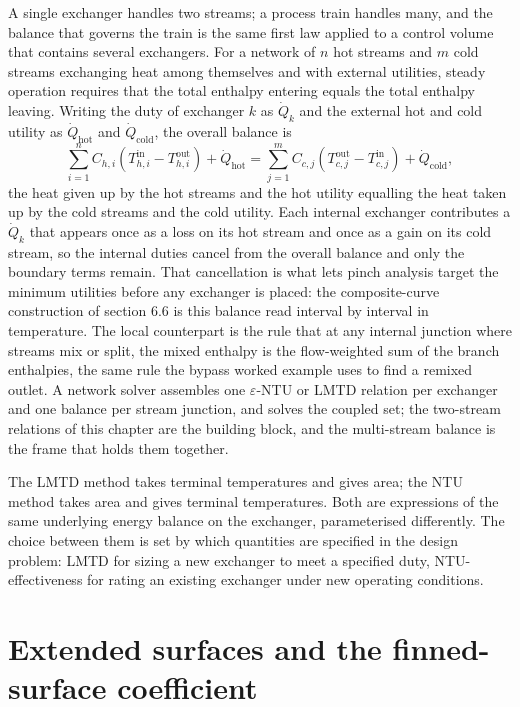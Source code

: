 A single exchanger handles two streams; a process train handles many, and the
balance that governs the train is the same first law applied to a control volume
that contains several exchangers. For a network of $n$ hot streams and $m$ cold
streams exchanging heat among themselves and with external utilities, steady
operation requires that the total enthalpy entering equals the total enthalpy
leaving. Writing the duty of exchanger $k$ as $\dot{Q}_k$ and the external hot and
cold utility as $\dot{Q}_{\text{hot}}$ and $\dot{Q}_{\text{cold}}$, the overall
balance is
\[
\sum_{i=1}^{n} C_{h,i}(T_{h,i}^{\text{in}} - T_{h,i}^{\text{out}})
+ \dot{Q}_{\text{hot}}
= \sum_{j=1}^{m} C_{c,j}(T_{c,j}^{\text{out}} - T_{c,j}^{\text{in}})
+ \dot{Q}_{\text{cold}},
\]
the heat given up by the hot streams and the hot utility equalling the heat taken
up by the cold streams and the cold utility. Each internal exchanger contributes a
$\dot{Q}_k$ that appears once as a loss on its hot stream and once as a gain on its
cold stream, so the internal duties cancel from the overall balance and only the
boundary terms remain. That cancellation is what lets pinch analysis target the
minimum utilities before any exchanger is placed: the composite-curve construction
of section 6.6 is this balance read interval by interval in temperature. The local
counterpart is the rule that at any internal junction where streams mix or split,
the mixed enthalpy is the flow-weighted sum of the branch enthalpies, the same rule
the bypass worked example uses to find a remixed outlet. A network solver assembles
one $\varepsilon$-NTU or LMTD relation per exchanger and one balance per stream
junction, and solves the coupled set; the two-stream relations of this chapter are
the building block, and the multi-stream balance is the frame that holds them
together.

\begin{principle}
The LMTD method takes terminal temperatures and gives area; the NTU
method takes area and gives terminal temperatures. Both are
expressions of the same underlying energy balance on the exchanger,
parameterised differently. The choice between them is set by which
quantities are specified in the design problem: LMTD for sizing a
new exchanger to meet a specified duty, NTU-effectiveness for
rating an existing exchanger under new operating conditions.
\end{principle}

\section{Extended surfaces and the finned-surface coefficient}

